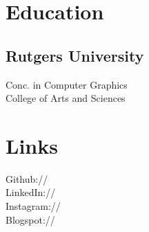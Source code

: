 \documentclass[]{deedy-resume-openfont}
\begin{document}
%
%


%
%

\begin{minipage}[t]{0.33\textwidth} 


\section{Education} 

\subsection{Rutgers University}
\sectionsep

Conc. in Computer Graphics \\
College of Arts and Sciences \\
\sectionsep


\section{Links} 
Github:// \href{https://github.com/11}
{} \\
LinkedIn://  \href{https://www.linkedin.com/in/DougRudolphJr}{} \\
Instagram://  \href{https://www.instagram.com/The_Guod_Life/}{} \\
Blogspot://  \href{https://blogspot.com/DougRudolph}{} \\

\sectionsep


\end{minipage}
\end{document}
